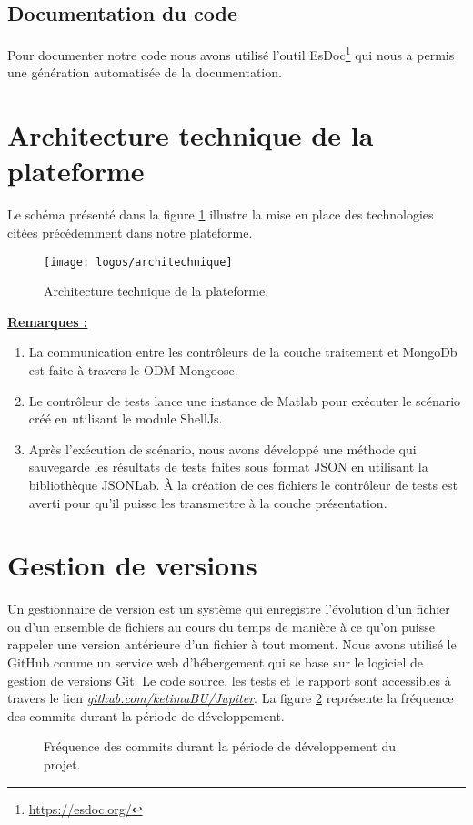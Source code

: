 \subsection{Documentation du code}
Pour documenter notre code nous avons utilisé l'outil EsDoc\footnote{\href{https://esdoc.org/}{https://esdoc.org/}} qui nous a permis une génération automatisée de la documentation.
\section{Architecture technique de la plateforme}
Le schéma présenté dans la figure \ref{fig:architechnique} illustre la mise en place des technologies citées précédemment dans notre
plateforme.

\begin{figure}[H]
	\centering
	\texttt{[image: logos/architechnique]}
	\caption{Architecture technique de la plateforme.}
	\label{fig:architechnique}
\end{figure}
\underline{\textbf{Remarques :}}
\begin{enumerate}
	\item La communication entre les contrôleurs de la couche traitement et MongoDb est faite à travers le ODM Mongoose.
	\item Le contrôleur de tests lance une instance de Matlab pour exécuter le scénario créé en utilisant le module ShellJs.
	\item Après l'exécution de scénario, nous avons développé une méthode qui sauvegarde les résultats de tests faites sous format JSON en utilisant la bibliothèque JSONLab. À la création de ces fichiers le contrôleur de tests est averti pour qu'il puisse les transmettre à la couche présentation.
\end{enumerate}


\section{Gestion de versions}
Un gestionnaire de version est un système qui enregistre l'évolution d'un fichier ou d'un ensemble de fichiers au cours du temps de manière à ce qu'on puisse rappeler une version antérieure d'un fichier à tout moment. Nous avons utilisé le GitHub comme un service web d'hébergement qui se base sur le logiciel de gestion de versions Git. Le code source, les tests et le rapport sont accessibles à travers le lien \href{https://github.com/ketimaBU/Jupiter}{\textit{github.com/ketimaBU/Jupiter}}. La figure \ref{fig:commits} représente la fréquence des commits durant la période
de développement.
\begin{figure}[H]
	\centering
	\caption{Fréquence des commits durant la période de développement du projet.}
	\label{fig:commits}
\end{figure}



